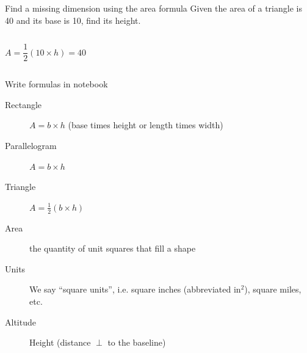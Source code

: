 \begin{frame}{Find a missing dimension using the area formula}
    Given the area of a triangle is 40 and its base is 10, find its height. \vspace{1cm}
    \begin{columns}
        $$A =  \frac{1}{2} (10 \times h) = 40$$
    \end{columns} \vspace{1.5cm}
    \end{frame}

\begin{frame}{Write formulas in notebook}
        \begin{description}
            \item[Rectangle] $A=b \times h$ (base times height or length times width)
            \item[Parallelogram] $A=b \times h$
            \item[Triangle] $A=\frac{1}{2} (b \times h)$ \vspace{0.5cm}
            \item[Area] the quantity of unit squares that fill a shape
            \item[Units] We say ``square units'', i.e. square inches (abbreviated $\text{in}^2$), square miles, etc.
            \item[Altitude] Height (distance $\perp$ to the baseline)
        \end{description}
    \end{frame}
    
